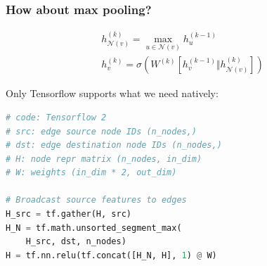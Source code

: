 \documentclass[10pt,aspectratio=169]{beamer}
\begin{document}
	\begin{frame}[fragile]
		\frametitle{How about max pooling?}
		
		\begin{minipage}{0.4\textwidth}
			$$
			\begin{gathered}
			h_{\mathcal{N}(v)}^{(k)} =
			\max_{u \in \mathcal{N}(v)} h^{(k-1)}_u \\
			h^{(k)}_v =
			\sigma \left( W^{(k)} \left[h_v^{(k-1)} \Vert h_{\mathcal{N}(v)}^{(k)}\right] \right)
			\end{gathered}
			$$
		\end{minipage}\hfill%
		\begin{minipage}{0.5\textwidth}
			Only Tensorflow supports what we need natively:
\begin{lstlisting}[language=Python]
# code: Tensorflow 2
# src: edge source node IDs (n_nodes,)
# dst: edge destination node IDs (n_nodes,)
# H: node repr matrix (n_nodes, in_dim)
# W: weights (in_dim * 2, out_dim)

# Broadcast source features to edges
H_src = tf.gather(H, src)
H_N = tf.math.unsorted_segment_max(
    H_src, dst, n_nodes)
H = tf.nn.relu(tf.concat([H_N, H], 1) @ W)
\end{lstlisting}
		\end{minipage}
	\end{frame}
\end{document}
